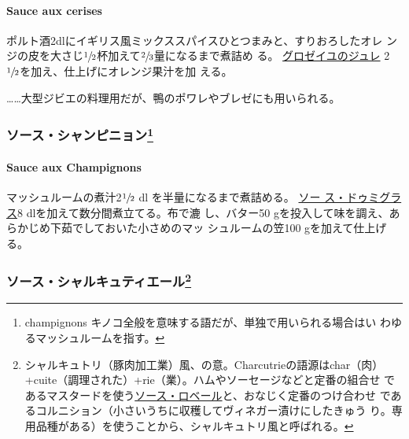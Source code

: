 \hypertarget{sauce-aux-cerises}{%
\paragraph{Sauce aux cerises}\label{sauce-aux-cerises}}


ポルト酒2dlにイギリス風ミックススパイスひとつまみと、すりおろしたオレ
ンジの皮を大さじ\(\sfrac{1}{2}\)杯加えて\(\sfrac{2}{3}\)量になるまで煮詰め
る。 \href{}{グロゼイユのジュレ}
2\(\sfrac{1}{2}\)を加え、仕上げにオレンジ果汁を加 える。

\ldots{}\ldots{}大型ジビエの料理用だが、鴨のポワレやブレゼにも用いられる。

\maeaki

\hypertarget{ux30bdux30fcux30b9ux30b7ux30e3ux30f3ux30d4ux30cbux30e7ux30f37}{%
\subsubsection[ソース・シャンピニョン]{\texorpdfstring{ソース・シャンピニョン\footnote{champignons
  キノコ全般を意味する語だが、単独で用いられる場合はい
  わゆるマッシュルームを指す。}}{ソース・シャンピニョン}}\label{ux30bdux30fcux30b9ux30b7ux30e3ux30f3ux30d4ux30cbux30e7ux30f37}}

\hypertarget{sauce-aux-champignons}{%
\paragraph{Sauce aux Champignons}\label{sauce-aux-champignons}}


マッシュルームの煮汁2\(\sfrac{1}{2}\) dl を半量になるまで煮詰める。
\protect\hyperlink{sauce-demi-glace}{ソー ス・ドゥミグラス}8
dlを加えて数分間煮立てる。布で漉 し、バター50
gを投入して味を調え、あらかじめ下茹でしておいた小さめのマッ
シュルームの笠100 gを加えて仕上げる。

\maeaki

\hypertarget{ux30bdux30fcux30b9ux30b7ux30e3ux30ebux30adux30e5ux30c6ux30a3ux30a8ux30fcux30eb8}{%
\subsubsection[ソース・シャルキュティエール]{\texorpdfstring{ソース・シャルキュティエール\footnote{シャルキュトリ（豚肉加工業）風、の意。Charcutrieの語源はchar（肉）
  +cuite（調理された）+rie（業）。ハムやソーセージなどと定番の組合せ
  であるマスタードを使う\protect\hyperlink{sauce-robert}{ソース・ロベール}と、おなじく定番のつけ合わせ
  であるコルニション（小さいうちに収穫してヴィネガー漬けにしたきゅう
  り。専用品種がある）を使うことから、シャルキュトリ風と呼ばれる。}}{ソース・シャルキュティエール}}\label{ux30bdux30fcux30b9ux30b7ux30e3ux30ebux30adux30e5ux30c6ux30a3ux30a8ux30fcux30eb8}}

